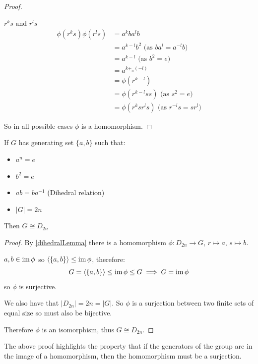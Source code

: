 \documentclass[../main.tex]{subfiles}
\begin{document}
\begin{proof}
\begin{proofcases}
\begin{case}{$r^{k}s \text{ and } r^{l}s$}
\begin{align*}
        \phi(r^{k}s)\phi(r^{l}s) &= a^{k} b a^{l}b \\
                                 &= a^{k - l} b^2 \text{ (as $ba^{l} = a^{-l}b$)}\\
                                 &= a^{k - l} \text{ (as $b^2 = e$)}\\
                                 &= a^{k +_n (-l)} \\
                                 &= \phi(r^{k - l}) \\
                                 &= \phi(r^{k - l} s s) \text{ (as $s^2 = e$)}\\
                                 &= \phi(r^{k} s r^{l} s) \text{ (as $r^{-l}s = sr^{l}$)}
      \end{align*}
    \end{case}
  \end{proofcases}
  So in all possible cases $\phi$ is a homomorphism.
\end{proof}
\begin{proposition}
  If $G$ has generating set $\{a, b\}$ such that: \label{dihedralIsomorphic}
  \begin{itemize}
    \item $a^{n} = e$
    \item $b^{2} = e$
    \item $ab = ba^{-1}$ (Dihedral relation)
    \item $|G| = 2n$
  \end{itemize}
  Then $G \cong D_{2n}$
\end{proposition}
\begin{proof}
  By \cref{dihedralLemma} there is a homomorphism $\phi: D_{2n} \to G$, $r \mapsto a$, $s \mapsto b$.

  $a, b \in \operatorname{im} \phi$ so $\langle \{a, b\} \rangle \leq \operatorname{im} \phi$, therefore:
  \[
    G = \langle \{a, b\} \rangle \leq \operatorname{im} \phi \leq G \implies G = \operatorname{im} \phi
  \]
  so $\phi$ is surjective.

  We also have that $|D_{2n}| = 2n = |G|$.
  So $\phi$ is a surjection between two finite sets of equal size so must also be bijective.

  Therefore $\phi$ is an isomorphism, thus $G \cong D_{2n}$.
\end{proof}
\begin{remark}
  The above proof highlights the property that if the generators of the group are in the image of a homomorphism, then the homomorphism must be a surjection.
\end{remark}
\end{document}

